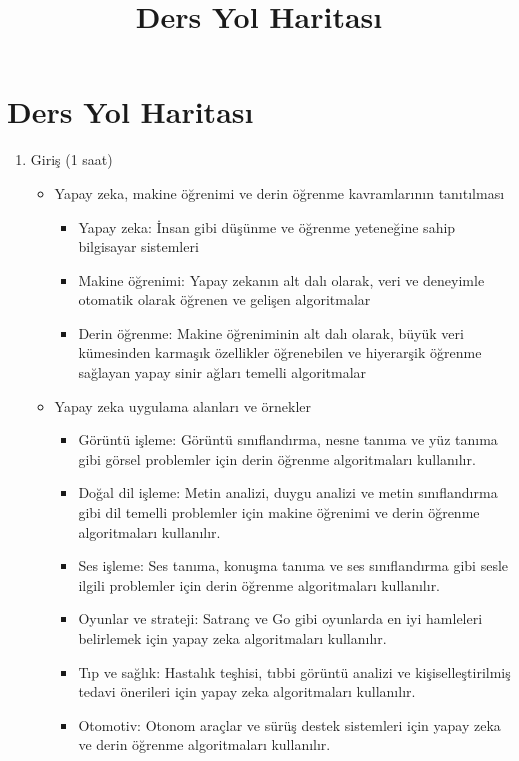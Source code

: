 \documentclass[12pt]{article}
\title{Ders Yol Haritası}
\author{}
\date{}
\begin{document}
\maketitle
\thispagestyle{fancy}

\section{Ders Yol Haritası}

\begin{enumerate}
    \item Giriş (1 saat)
    \begin{itemize}
        \item Yapay zeka, makine öğrenimi ve derin öğrenme kavramlarının tanıtılması
        \begin{itemize}
            \item Yapay zeka: İnsan gibi düşünme ve öğrenme yeteneğine sahip bilgisayar sistemleri
            \item Makine öğrenimi: Yapay zekanın alt dalı olarak, veri ve deneyimle otomatik olarak öğrenen ve gelişen algoritmalar
            \item Derin öğrenme: Makine öğreniminin alt dalı olarak, büyük veri kümesinden karmaşık özellikler öğrenebilen ve hiyerarşik öğrenme sağlayan yapay sinir ağları temelli algoritmalar
        \end{itemize}
        \item Yapay zeka uygulama alanları ve örnekler
        \begin{itemize}
            \item Görüntü işleme: Görüntü sınıflandırma, nesne tanıma ve yüz tanıma gibi görsel problemler için derin öğrenme algoritmaları kullanılır.
            \item Doğal dil işleme: Metin analizi, duygu analizi ve metin sınıflandırma gibi dil temelli problemler için makine öğrenimi ve derin öğrenme algoritmaları kullanılır.
            \item Ses işleme: Ses tanıma, konuşma tanıma ve ses sınıflandırma gibi sesle ilgili problemler için derin öğrenme algoritmaları kullanılır.
            \item Oyunlar ve strateji: Satranç ve Go gibi oyunlarda en iyi hamleleri belirlemek için yapay zeka algoritmaları kullanılır.
            \item Tıp ve sağlık: Hastalık teşhisi, tıbbi görüntü analizi ve kişiselleştirilmiş tedavi önerileri için yapay zeka algoritmaları kullanılır.
            \item Otomotiv: Otonom araçlar ve sürüş destek sistemleri için yapay zeka ve derin öğrenme algoritmaları kullanılır.

\end{itemize}
\end{itemize}
\end{enumerate}
\end{document}
